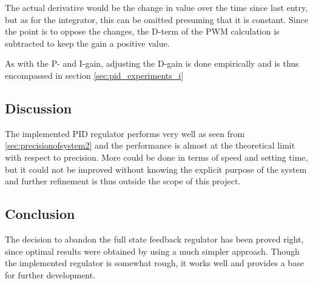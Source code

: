 The actual derivative would be the change in value over the time since last entry, but as for the integrator, this can be omitted presuming that it is constant. Since the point is to oppose the changes, the D-term of the PWM calculation is subtracted to keep the gain a positive value.

As with the P- and I-gain, adjusting the D-gain is done empirically and is thus encompassed in section \ref{sec:pid_experiments_i}


\subsection{Discussion}
The implemented PID regulator performs very well as seen from \ref{sec:precisionofsystem2} and the performance is almost at the theoretical limit with respect to precision. More could be done in terms of speed and setting time, but it could not be improved without knowing the explicit purpose of the system and further refinement is thus outside the scope of this project.

\subsection{Conclusion}
The decision to abandon the full state feedback regulator has been proved right, since optimal results were obtained by using a much simpler approach. Though the implemented regulator is somewhat rough, it works well and provides a base for further development.











